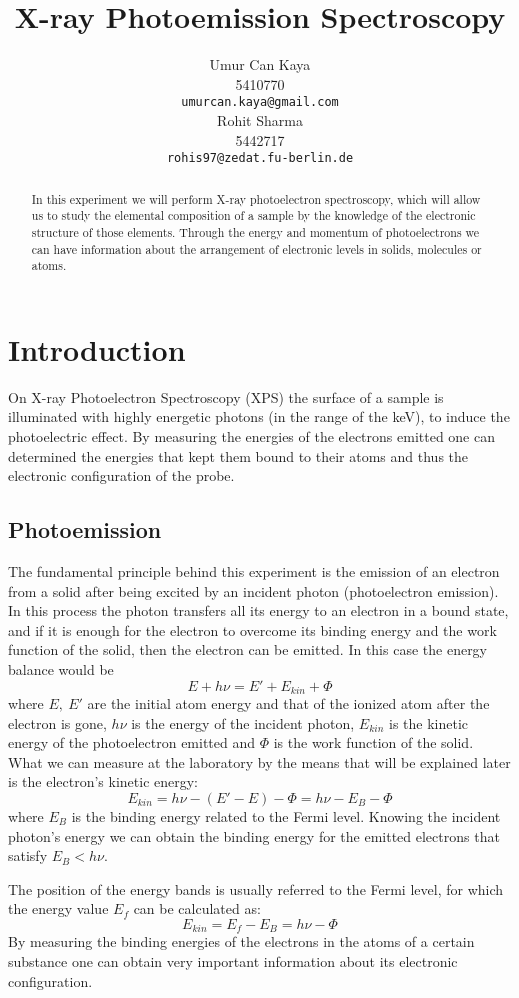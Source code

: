 \documentclass{article}
\title{X-ray Photoemission Spectroscopy}
\author{
Umur Can Kaya\\
5410770\\
\texttt{umurcan.kaya@gmail.com}\\
\And
Rohit Sharma\\
5442717\\
\texttt{rohis97@zedat.fu-berlin.de}\\
}
\begin{document}
\maketitle

\begin{abstract}
In this experiment we will perform X-ray photoelectron spectroscopy, which will allow us to study the
elemental composition of a sample by the knowledge of the electronic structure of those elements. Through
the energy and momentum of photoelectrons we can have information about the arrangement of electronic
levels in solids, molecules or atoms.
\end{abstract}

\section{Introduction}
On X-ray Photoelectron Spectroscopy (XPS) the surface of a sample is illuminated with highly energetic
photons (in the range of the keV), to induce the photoelectric effect. By measuring the energies of the
electrons emitted one can determined the energies that kept them bound to their atoms and thus the electronic configuration of the probe. 
\subsection{Photoemission}
The fundamental principle behind this experiment is the emission of an electron from a solid after being
excited by an incident photon (photoelectron emission). In this process the photon transfers all its energy
to an electron in a bound state, and if it is enough for the electron to overcome its binding energy and the work function of the solid, then the electron can be emitted. In this case the energy balance would be
$$
E + h\nu = E' + E_{kin} + \Phi
$$
where $E,\ E'$ are the initial atom energy and that of the ionized atom after the electron is gone, $h\nu$ is the energy of the incident photon, $E _{kin}$ is the kinetic energy of the photoelectron emitted and $\Phi$ is the work function of the solid. What we can measure at the laboratory by the means that will be explained later is the electron’s kinetic energy:
$$
E_{kin} = h\nu - (E' - E) - \Phi = h\nu - E_B - \Phi
$$
where $E_B$ is the binding energy related to the Fermi level. Knowing the incident photon’s energy we can obtain the binding energy for the emitted electrons that satisfy $E_B < h\nu$.

The position of the energy bands is usually referred to the Fermi level, for which the energy value $E_f$ can be calculated as:
$$
E_{kin} = E_f - E_B = h\nu - \Phi
$$
By measuring the binding energies of the electrons in the atoms of a certain substance one can obtain very
important information about its electronic configuration. 
\end{document}
